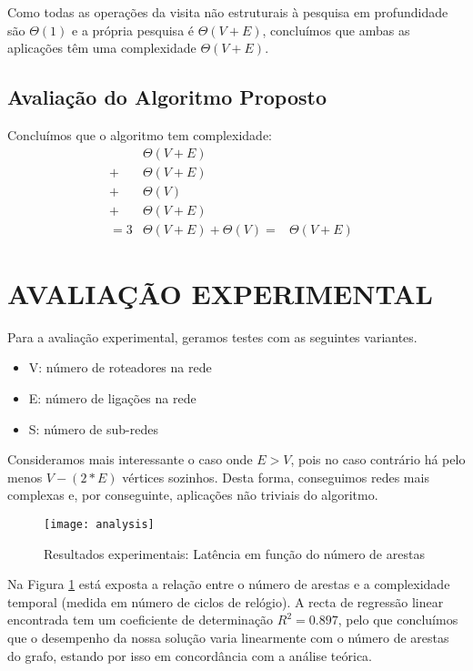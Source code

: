 \documentclass[a4paper, 12pt, conference]{ieeeconf}
\begin{document}
Como todas as operações da visita não estruturais à pesquisa em profundidade são
$\Theta(1)$ e a própria pesquisa é $\Theta(V + E)$, concluímos que ambas as
aplicações têm uma complexidade $\Theta(V + E)$.

\subsection{Avaliação do Algoritmo Proposto}
Concluímos que o algoritmo tem complexidade:
\begin{align*}
  &\Theta(V + E) && \tag{Construção do Grafo}\\
  + &\Theta(V + E) && \tag{Aplicação 1ª DFS}\\
  + &\Theta(V) && \tag{Rem. P. de Articulação}\\
  + &\Theta(V + E) && \tag{Aplicação 2ª DFS}\\
  = 3&\Theta(V + E) + \Theta(V)
  = &\Theta(V + E)
\end{align*}

\section{AVALIAÇÃO EXPERIMENTAL}\label{experimental}
Para a avaliação experimental, geramos testes com as seguintes variantes.
\begin{itemize}
  \item V: número de roteadores na rede
  \item E: número de ligações na rede
  \item S: número de sub-redes
\end{itemize}

Consideramos mais interessante o caso onde $E > V$, pois no caso contrário há
pelo menos $V - (2 * E)$ vértices sozinhos. Desta forma, conseguimos redes mais
complexas e, por conseguinte, aplicações não triviais do algoritmo.

\begin{figure}[t]
  \centering
  \texttt{[image: analysis]}
  \caption{Resultados experimentais: Latência em função do número de arestas}
  \label{res}
\end{figure}

Na Figura \ref{res} está exposta a relação entre o número de arestas e a
complexidade temporal (medida em número de ciclos de relógio). A recta de
regressão linear encontrada tem um coeficiente de determinação $R^2 = 0.897$,
pelo que concluímos que o desempenho da nossa solução varia linearmente com o
número de arestas do grafo, estando por isso em concordância com a análise
teórica.
\end{document}
